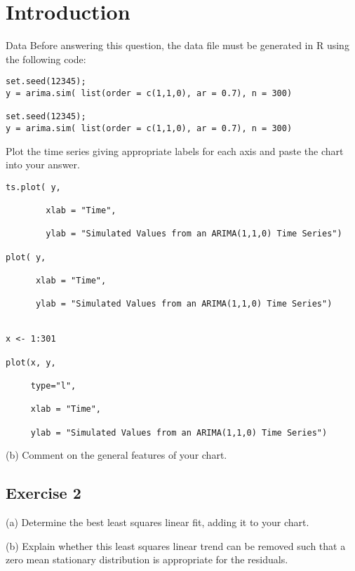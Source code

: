 \documentclass[a4paper,12pt]{article}
\begin{document}
\section{Introduction}

Data
Before answering this question, the data file must be generated in R using the following code:

\begin{framed}
\begin{verbatim}
set.seed(12345); 
y = arima.sim( list(order = c(1,1,0), ar = 0.7), n = 300)

set.seed(12345); 
y = arima.sim( list(order = c(1,1,0), ar = 0.7), n = 300)
\end{verbatim}
\end{framed}

Plot the time series giving appropriate labels for each axis and paste the chart into your answer.

\begin{framed}
\begin{verbatim}
ts.plot( y, 
        
        xlab = "Time", 
  
        ylab = "Simulated Values from an ARIMA(1,1,0) Time Series")

plot( y, 
  
      xlab = "Time", 
  
      ylab = "Simulated Values from an ARIMA(1,1,0) Time Series")
​

x <- 1:301
​
plot(x, y, 
     
     type="l", 
     
     xlab = "Time", 
  
     ylab = "Simulated Values from an ARIMA(1,1,0) Time Series")
\end{verbatim}
\end{framed}

\newpage 

(b) Comment on the general features of your chart.

\newpage 
\subsection*{Exercise 2}
(a) Determine the best least squares linear fit, adding it to your chart.

(b) Explain whether this least squares linear trend can be removed such that a zero mean stationary distribution is appropriate for the residuals.
\end{document}
